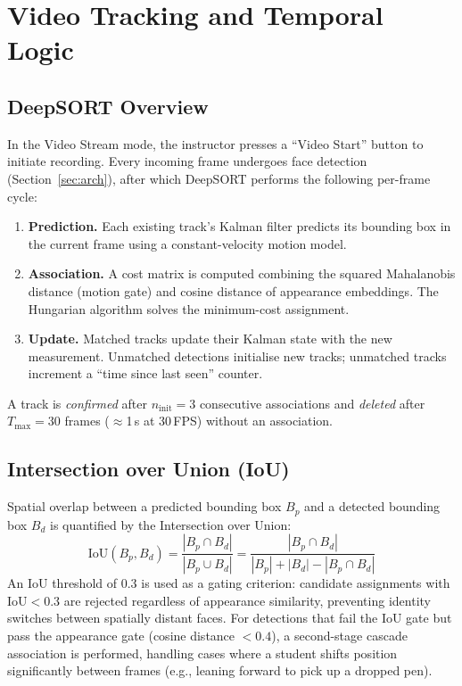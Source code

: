 \documentclass[conference, 10pt]{IEEEtran}
\begin{document}

\section{Video Tracking and Temporal Logic}
\label{sec:tracking}

\subsection{DeepSORT Overview}

In the Video Stream mode, the instructor presses a ``Video Start'' button to initiate
recording.  Every incoming frame undergoes face detection (Section~\ref{sec:arch}), after which
DeepSORT performs the following per-frame cycle:

\begin{enumerate}
    \item \textbf{Prediction.}  Each existing track's Kalman filter predicts its bounding box
          in the current frame using a constant-velocity motion model.
    \item \textbf{Association.}  A cost matrix is computed combining the squared Mahalanobis
          distance (motion gate) and cosine distance of appearance embeddings.  The Hungarian
          algorithm solves the minimum-cost assignment.
    \item \textbf{Update.}  Matched tracks update their Kalman state with the new measurement.
          Unmatched detections initialise new tracks; unmatched tracks increment a ``time since
          last seen'' counter.
\end{enumerate}

A track is \emph{confirmed} after $n_{\text{init}} = 3$ consecutive associations and
\emph{deleted} after $T_{\text{max}} = 30$ frames ($\approx$1\,s at 30\,FPS) without an
association.

\subsection{Intersection over Union (IoU)}

Spatial overlap between a predicted bounding box $B_p$ and a detected bounding box $B_d$ is
quantified by the Intersection over Union:
\begin{equation}
\label{eq:iou}
    \text{IoU}(B_p, B_d)
    = \frac{|B_p \cap B_d|}{|B_p \cup B_d|}
    = \frac{|B_p \cap B_d|}{|B_p| + |B_d| - |B_p \cap B_d|}
\end{equation}
An IoU threshold of $0.3$ is used as a gating criterion: candidate assignments with
$\text{IoU} < 0.3$ are rejected regardless of appearance similarity, preventing identity
switches between spatially distant faces.  For detections that fail the IoU gate but pass the
appearance gate (cosine distance $< 0.4$), a second-stage cascade association is performed,
handling cases where a student shifts position significantly between frames (e.g., leaning
forward to pick up a dropped pen).
\end{document}
